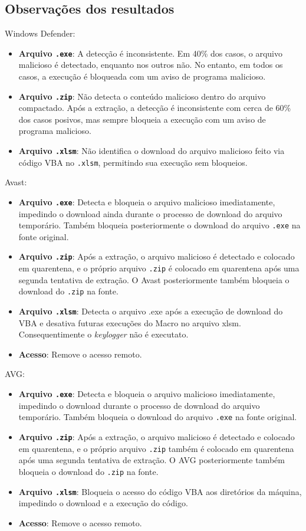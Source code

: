 \documentclass[12pt]{article}
\begin{document}
\subsection{Observações dos resultados}
Windows Defender:
\begin{itemize}
    \item \textbf{Arquivo \texttt{.exe}}: A detecção é inconsistente. Em 40\% dos casos, o arquivo malicioso é detectado, enquanto nos outros não. No entanto, em todos os casos, a execução é bloqueada com um aviso de programa malicioso.
    \item \textbf{Arquivo \texttt{.zip}}: Não detecta o conteúdo malicioso dentro do arquivo compactado. Após a extração, a detecção é inconsistente com cerca de 60\% dos casos posivos, mas sempre bloqueia a execução com um aviso de programa malicioso.
    \item \textbf{Arquivo \texttt{.xlsm}}: Não identifica o download do arquivo malicioso feito via código VBA no \texttt{.xlsm}, permitindo sua execução sem bloqueios.
\end{itemize}

\noindent Avast:
\begin{itemize}
    \item \textbf{Arquivo \texttt{.exe}}: Detecta e bloqueia o arquivo malicioso imediatamente, impedindo o download ainda durante o processo de download do arquivo temporário. Também bloqueia posteriormente o download do arquivo \texttt{.exe} na fonte original.
    \item \textbf{Arquivo \texttt{.zip}}: Após a extração, o arquivo malicioso é detectado e colocado em quarentena, e o próprio arquivo \texttt{.zip} é colocado em quarentena após uma segunda tentativa de extração. O Avast posteriormente também bloqueia o download do \texttt{.zip} na fonte.
    \item \textbf{Arquivo \texttt{.xlsm}}:  Detecta o arquivo .exe após a execução de download do VBA e desativa futuras execuções do Macro no arquivo xlsm. Consequentimente o \textit{keylogger} não é executato.
    \item \textbf{Acesso}: Remove o acesso remoto.
\end{itemize}

\noindent AVG:
\begin{itemize}
    \item \textbf{Arquivo \texttt{.exe}}: Detecta e bloqueia o arquivo malicioso imediatamente, impedindo o download durante o processo de download do arquivo temporário. Também bloqueia o download do arquivo \texttt{.exe} na fonte original.
    \item \textbf{Arquivo \texttt{.zip}}: Após a extração, o arquivo malicioso é detectado e colocado em quarentena, e o próprio arquivo \texttt{.zip} também é colocado em quarentena após uma segunda tentativa de extração. O AVG posteriormente também bloqueia o download do \texttt{.zip} na fonte.
    \item \textbf{Arquivo \texttt{.xlsm}}: Bloqueia o acesso do código VBA aos diretórios da máquina, impedindo o download e a execução do código.
    \item \textbf{Acesso}: Remove o acesso remoto.
\end{itemize}
\end{document}
